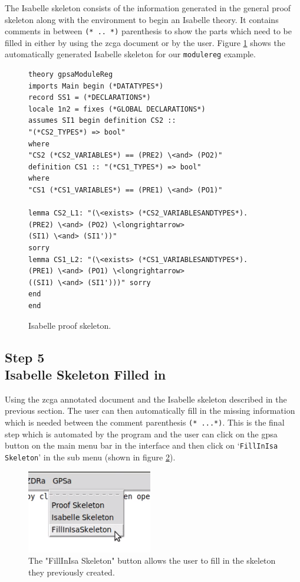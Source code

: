  The Isabelle skeleton consists of the information generated in the general
 proof skeleton along with the environment to begin an Isabelle theory. It
 contains comments in between \verb|(* .. *)| parenthesis to show the parts which
 need to be filled in either by using the \gls{zcga} document or by the user.
 Figure \ref{fig:isaFullexample} shows the automatically generated Isabelle
 skeleton for our \texttt{modulereg} example.

\begin{figure}[H]
\centering
\begin{scriptsize}
\begin{BVerbatim}
theory gpsaModuleReg
imports Main begin (*DATATYPES*)
record SS1 = (*DECLARATIONS*)
locale 1n2 = fixes (*GLOBAL DECLARATIONS*)
assumes SI1 begin definition CS2 ::
"(*CS2_TYPES*) => bool"
where
"CS2 (*CS2_VARIABLES*) == (PRE2) \<and> (PO2)"
definition CS1 :: "(*CS1_TYPES*) => bool"
where
"CS1 (*CS1_VARIABLES*) == (PRE1) \<and> (PO1)"

lemma CS2_L1: "(\<exists> (*CS2_VARIABLESANDTYPES*).
(PRE2) \<and> (PO2) \<longrightarrow> 
(SI1) \<and> (SI1'))" 
sorry 
lemma CS1_L2: "(\<exists> (*CS1_VARIABLESANDTYPES*).
(PRE1) \<and> (PO1) \<longrightarrow> 
((SI1) \<and> (SI1')))" sorry 
end
end
\end{BVerbatim}
\end{scriptsize}
\caption{Isabelle proof skeleton. \label{fig:isaFullexample}}
\end{figure}

\subsection{Step 5\\Isabelle Skeleton Filled in}

Using the \gls{zcga} annotated document and the Isabelle skeleton described in
the previous section. The user can then automatically fill in the missing
information which is needed between the comment parenthesis \verb|(* ...*)|.
This is the final step which is automated by the program and the user can click
on the \gls{gpsa} button on the main menu bar in the interface and then click on
`\texttt{FillInIsa Skeleton}' in the sub menu (shown in figure
\ref{fig:fillinisa}).

\begin{figure}[H]
\centering
\includegraphics[scale=1]{Figures/fullexample/fillinisabutton.png}
\caption{The "FillInIsa Skeleton" button allows the user to fill in the skeleton they previously created. \label{fig:fillinisa}}
\end{figure}

